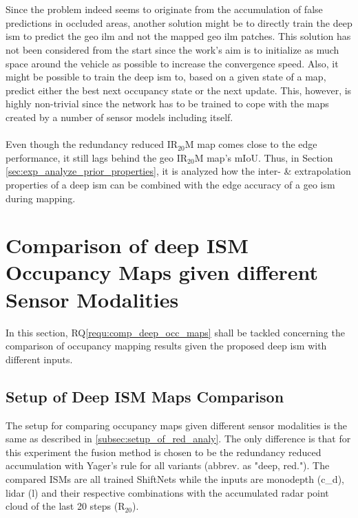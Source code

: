 \\\\
Since the problem indeed seems to originate from the accumulation of false predictions in occluded areas, another solution might be to directly train the deep \gls{ism} to predict the geo \gls{ilm} and not the mapped geo \gls{ilm} patches. This solution has not been considered from the start since the work's aim is to initialize as much space around the vehicle as possible to increase the convergence speed. Also, it might be possible to train the deep \gls{ism} to, based on a given state of a map, predict either the best next occupancy state or the next update. This, however, is highly non-trivial since the network has to be trained to cope with the maps created by a number of sensor models including itself. 
\\\\
Even though the redundancy reduced IR$_{20}$M map comes close to the edge performance, it still lags behind the geo IR$_{20}$M map's mIoU. Thus, in Section \ref{sec:exp_analyze_prior_properties}, it is analyzed how the inter- \& extrapolation properties of a deep \gls{ism} can be combined with the edge accuracy of a geo \gls{ism} during mapping.
%
\section{Comparison of deep ISM Occupancy Maps given different Sensor Modalities}
\label{sec:exp_comparison_deep_ism_maps_diff_sensors}
In this section, RQ\ref{requ:comp_deep_occ_maps} shall be tackled concerning the comparison of occupancy mapping results given the proposed deep \gls{ism} with different inputs.
%
\subsection{Setup of Deep ISM Maps Comparison}
\label{subsec:setup_analyze_deep_ism_maps_diff_sensors}
The setup for comparing occupancy maps given different sensor modalities is the same as described in \ref{subsec:setup_of_red_analy}. The only difference is that for this experiment the fusion method is chosen to be the redundancy reduced accumulation with Yager's rule for all variants (abbrev. as "deep, red."). The compared ISMs are all trained ShiftNets while the inputs are \gls{monodepth} (\gls{c_d}), lidar (\gls{l}) and their respective combinations with the accumulated radar point cloud of the last 20 steps (R$_{20}$). 
%
